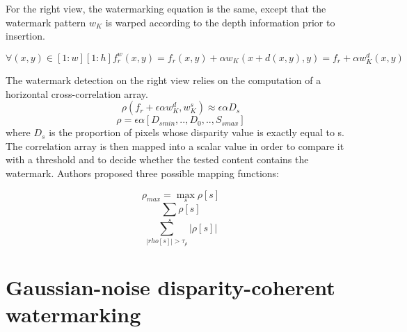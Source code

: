 For the right view, the watermarking equation is the same, except that the watermark pattern $w_{K}$ is warped according to the depth information prior to insertion.

$$\forall(x,y) \in [1:w][1:h] f_{r}^{w}(x,y) = f_{r}(x,y)+\alpha w_{K}(x+d(x,y),y) = f_{r}+\alpha w_{K}^{d}(x,y) $$

The watermark detection on the right view relies on the computation of a horizontal cross-correlation array.\newline
$$\rho (f_{r}+\epsilon\alpha w_{K}^{d},w_{K}^{s})\approx\epsilon\alpha D_{s} $$
$$ \rho = \epsilon\alpha [D_{smin},..,D_{0},..,S_{smax}]$$
where $D_{s}$ is the proportion of pixels whose disparity value is exactly equal to s.\newline
The correlation array is then mapped into a scalar value in order to compare it with a threshold and to decide whether the tested content contains the watermark. Authors proposed three possible mapping functions:

$$\rho_{max}= \max_{s}\rho[s] $$
$$ \sum_{s}\rho[s] $$
$$ \sum_{|rho[s]|>\tau_{\rho}}|\rho[s]| $$

\section{ Gaussian-noise disparity-coherent watermarking} 

